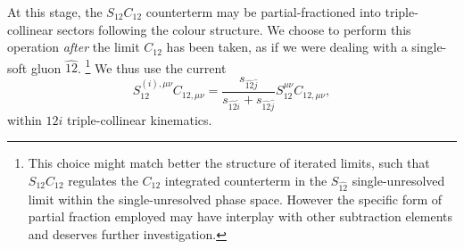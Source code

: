 \documentclass[11pt,a4paper]{article}
\newcommand{\mpd}[1]{\widehat{#1}}
\begin{document}
At this stage, the $S_{12}C_{12}$ counterterm may be partial-fractioned
into triple-collinear sectors following the colour structure.
We choose to perform this operation \emph{after} the limit $C_{12}$
has been taken, as if we were dealing with a single-soft gluon $\mpd{12}$.%
\footnote{
This choice might match better the structure of iterated limits,
such that $S_{12}C_{12}$ regulates the $C_{12}$ integrated counterterm
in the $S_{\mpd{12}}$ single-unresolved limit
within the single-unresolved phase space.
However the specific form of partial fraction employed
may have interplay with other subtraction elements
and deserves further investigation.
}
We thus use the current
\begin{equation}
	S_{12}^{(i),\mu\nu} C_{12,\mu\nu}
	= \frac{s_{\mpd{12}\mpd{j}}}{s_{\mpd{12}\mpd{i}}+s_{\mpd{12}\mpd{j}}}
	S_{12}^{\mu\nu} C_{12,\mu\nu},
\end{equation}
within $12i$ triple-collinear kinematics.
\end{document}
